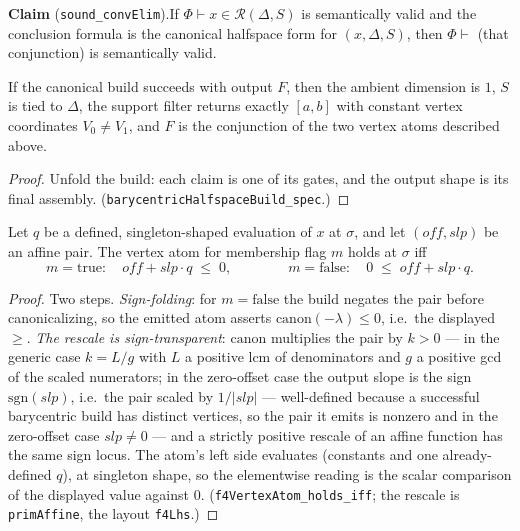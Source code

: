 \textbf{Claim} (\texttt{sound\_convElim}).\enspace If
$\Phi \vdash x \in \mathcal{R}(\Delta, S)$ is semantically valid and the
conclusion formula is the canonical halfspace form for
$(x, \Delta, S)$, then $\Phi \vdash$ (that conjunction) is semantically
valid.

\begin{blemma}\label{lem:convelim-spec}
If the canonical build succeeds with output $F$, then the ambient
dimension is $1$, $S$ is tied to $\Delta$, the support filter returns
exactly $[a, b]$ with constant vertex coordinates $V_0 \neq V_1$, and
$F$ is the conjunction of the two vertex atoms described above.
\end{blemma}
\begin{proof}
Unfold the build: each claim is one of its gates, and the output shape
is its final assembly. (\texttt{barycentricHalfspaceBuild\_spec}.)
\end{proof}

\begin{blemma}
\label{lem:convelim-atom}
Let $q$ be a defined, singleton-shaped evaluation of $x$ at $\sigma$, and
let $(\mathit{off}, \mathit{slp})$ be an affine pair. The vertex atom for
membership flag $m$ holds at $\sigma$ iff
\[
m = \mathrm{true}:\quad \mathit{off} + \mathit{slp}\cdot q \;\leq\; 0,
\qquad\qquad
m = \mathrm{false}:\quad 0 \;\leq\; \mathit{off} + \mathit{slp}\cdot q.
\]
\end{blemma}
\begin{proof}
Two steps. \emph{Sign-folding}: for $m = \mathrm{false}$ the build
negates the pair before canonicalizing, so the emitted atom asserts
$\mathrm{canon}(-\lambda) \leq 0$, i.e.\ the displayed $\geq$. \emph{The
rescale is sign-transparent}: $\mathrm{canon}$ multiplies the pair by
$k > 0$ --- in the generic case $k = L/g$ with $L$ a positive lcm of
denominators and $g$ a positive gcd of the scaled numerators; in the
zero-offset case the output slope is the sign
$\mathrm{sgn}(\mathit{slp})$, i.e.\ the pair scaled by $1/|\mathit{slp}|$
--- well-defined because a successful barycentric build has distinct
vertices, so the pair it emits is nonzero and in the zero-offset case
$\mathit{slp} \neq 0$ --- and a strictly positive rescale of an affine
function has the same sign locus. The atom's left side evaluates (constants and one already-
defined $q$), at singleton shape, so the elementwise reading is the
scalar comparison of the displayed value against $0$.
(\texttt{f4VertexAtom\_holds\_iff}; the rescale is
\texttt{primAffine}, the layout \texttt{f4Lhs}.)
\end{proof}


